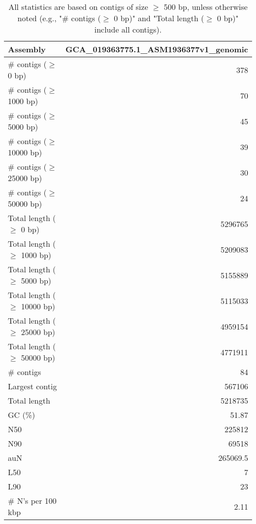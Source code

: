 \documentclass[12pt,a4paper]{article}
\begin{document}
\begin{table}[ht]
\begin{center}
\caption{All statistics are based on contigs of size $\geq$ 500 bp, unless otherwise noted (e.g., "\# contigs ($\geq$ 0 bp)" and "Total length ($\geq$ 0 bp)" include all contigs).}
\begin{tabular}{|l*{1}{|r}|}
\hline
Assembly & GCA\_019363775.1\_ASM1936377v1\_genomic \\ \hline
\# contigs ($\geq$ 0 bp) & 378 \\ \hline
\# contigs ($\geq$ 1000 bp) & 70 \\ \hline
\# contigs ($\geq$ 5000 bp) & 45 \\ \hline
\# contigs ($\geq$ 10000 bp) & 39 \\ \hline
\# contigs ($\geq$ 25000 bp) & 30 \\ \hline
\# contigs ($\geq$ 50000 bp) & 24 \\ \hline
Total length ($\geq$ 0 bp) & 5296765 \\ \hline
Total length ($\geq$ 1000 bp) & 5209083 \\ \hline
Total length ($\geq$ 5000 bp) & 5155889 \\ \hline
Total length ($\geq$ 10000 bp) & 5115033 \\ \hline
Total length ($\geq$ 25000 bp) & 4959154 \\ \hline
Total length ($\geq$ 50000 bp) & 4771911 \\ \hline
\# contigs & 84 \\ \hline
Largest contig & 567106 \\ \hline
Total length & 5218735 \\ \hline
GC (\%) & 51.87 \\ \hline
N50 & 225812 \\ \hline
N90 & 69518 \\ \hline
auN & 265069.5 \\ \hline
L50 & 7 \\ \hline
L90 & 23 \\ \hline
\# N's per 100 kbp & 2.11 \\ \hline
\end{tabular}
\end{center}
\end{table}
\end{document}
